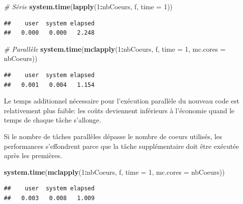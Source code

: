 \documentclass[
  12pt,
  french,
  a4paper,
  extrafontsizes,onecolumn,openright
  ]{memoir}
\newenvironment{Shaded}{\begin{snugshade}}{\end{snugshade}}
\newcommand{\CommentTok}[1]{\textcolor[rgb]{0.56,0.35,0.01}{\textit{#1}}}
\newcommand{\DataTypeTok}[1]{\textcolor[rgb]{0.13,0.29,0.53}{#1}}
\newcommand{\DecValTok}[1]{\textcolor[rgb]{0.00,0.00,0.81}{#1}}
\newcommand{\KeywordTok}[1]{\textcolor[rgb]{0.13,0.29,0.53}{\textbf{#1}}}
\newcommand{\NormalTok}[1]{#1}
\newcommand{\OperatorTok}[1]{\textcolor[rgb]{0.81,0.36,0.00}{\textbf{#1}}}
\newlength{\rf}
\begin{document}
\scriptsize

\begin{Shaded}
\begin{Highlighting}[]
\CommentTok{# Série}
\KeywordTok{system.time}\NormalTok{(}\KeywordTok{lapply}\NormalTok{(}\DecValTok{1}\OperatorTok{:}\NormalTok{nbCoeurs, f, }\DataTypeTok{time =} \DecValTok{1}\NormalTok{))}
\end{Highlighting}
\end{Shaded}

\begin{verbatim}
##    user  system elapsed 
##   0.000   0.000   2.248
\end{verbatim}

\begin{Shaded}
\begin{Highlighting}[]
\CommentTok{# Parallèle}
\KeywordTok{system.time}\NormalTok{(}\KeywordTok{mclapply}\NormalTok{(}\DecValTok{1}\OperatorTok{:}\NormalTok{nbCoeurs, f, }\DataTypeTok{time =} \DecValTok{1}\NormalTok{, }\DataTypeTok{mc.cores =}\NormalTok{ nbCoeurs))}
\end{Highlighting}
\end{Shaded}

\begin{verbatim}
##    user  system elapsed 
##   0.001   0.004   1.154
\end{verbatim}

\normalsize

Le temps additionnel nécessaire pour l'exécution parallèle du nouveau code est relativement plus faible: les coûts deviennent inférieurs à l'économie quand le temps de chaque tâche s'allonge.

Si le nombre de tâches parallèles dépasse le nombre de coeurs utilisés, les performances s'effondrent parce que la tâche supplémentaire doit être exécutée après les premières.

\scriptsize

\begin{Shaded}
\begin{Highlighting}[]
\KeywordTok{system.time}\NormalTok{(}\KeywordTok{mclapply}\NormalTok{(}\DecValTok{1}\OperatorTok{:}\NormalTok{nbCoeurs, f, }\DataTypeTok{time =} \DecValTok{1}\NormalTok{, }\DataTypeTok{mc.cores =}\NormalTok{ nbCoeurs))}
\end{Highlighting}
\end{Shaded}

\begin{verbatim}
##    user  system elapsed 
##   0.003   0.008   1.009
\end{verbatim}
\end{document}
